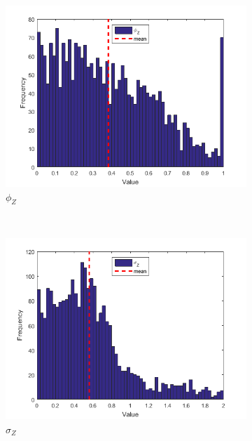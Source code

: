 \documentclass[11pt,a4,twosided,singlespacing,titlepagenumber=on]{scrreprt}
\numberwithin{equation}{chapter} %
\theoremstyle{remark}
\begin{document}
\begin{figure}[H]
\begin{subfigure}[t]{0.32\textwidth}
        \includegraphics[width=1\textwidth]{res/params/4384_5114/3}
        \caption{$\phi_Z$}
    \end{subfigure} \\
    \begin{subfigure}[t]{0.32\textwidth}
        \centering
        \includegraphics[width=1\textwidth]{res/params/4384_5114/4}
        \caption{$\sigma_Z$}
    \end{subfigure}
    \begin{subfigure}[t]{0.32\textwidth}
        \centering

\end{subfigure}
\end{figure}
\end{document}

